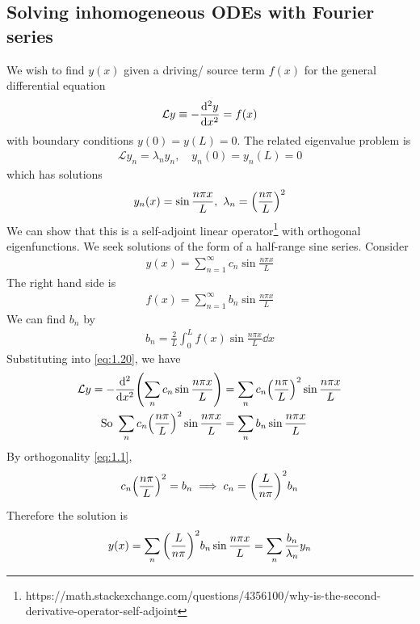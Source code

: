     \subsection{Solving inhomogeneous ODEs with Fourier series}
    We wish to find $y(x)$ given a driving/ source term $f(x)$ for the general differential equation
    \begin{align} \label{eq:1.20}
        \mathcal L y \equiv -\dv[2]{y}{x} = f(x)
    \end{align}
    with boundary conditions $y(0) = y(L) = 0$.
    The related eigenvalue problem is
    \begin{align*}
        \mathcal L y_n = \lambda_n y_n,\quad y_n(0) = y_n(L) = 0
    \end{align*}
    which has solutions
    \begin{align} \label{eq:1.21}
        y_n(x) = \sin \frac{n \pi x}{L},\ \lambda_n = \qty(\frac{n\pi}{L})^2
    \end{align}
    We can show that this is a self-adjoint linear operator\footnote{https://math.stackexchange.com/questions/4356100/why-is-the-second-derivative-operator-self-adjoint} with orthogonal eigenfunctions.
    We seek solutions of the form of a half-range sine series.
    Consider
    \begin{align*}
        y(x) = \sum_{n=1}^\infty c_n \sin\frac{n \pi x}{L}
    \end{align*}
    The right hand side is
    \begin{align*}
        f(x) = \sum_{n=1}^\infty b_n \sin \frac{n \pi x}{L}
    \end{align*}
    We can find $b_n$ by
    \begin{align*}
        b_n = \frac{2}{L} \int_0^L f(x) \sin \frac{n \pi x}{L} \dd{x}
    \end{align*}
    Substituting into \cref{eq:1.20}, we have
    \begin{align*}
        \mathcal L y = -\dv[2]{x} \qty(\sum_n c_n \sin \frac{n \pi x}{L}) &= \sum_n c_n \qty(\frac{n\pi}{L})^2 \sin \frac{n \pi x}{L} \\
        \text{So } \sum_n c_n \qty(\frac{n\pi}{L})^2 \sin \frac{n \pi x}{L} &= \sum_n b_n \sin \frac{n \pi x}{L}
    \end{align*}
    By orthogonality \cref{eq:1.1},
    \begin{align*}
        c_n \qty(\frac{n \pi}{L})^2 = b_n \implies c_n = \qty(\frac{L}{n \pi})^2 b_n
    \end{align*}
    Therefore the solution is
    \begin{align} \label{eq:1.22}
        y(x) = \sum_n \qty(\frac{L}{n \pi})^2 b_n \sin \frac{n \pi x}{L} = \sum_n \frac{b_n}{\lambda_n} y_n
    \end{align}
